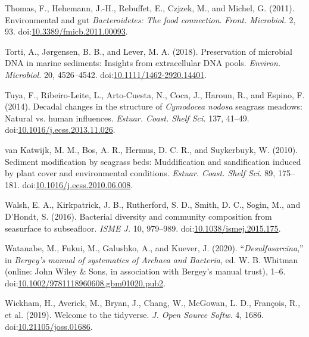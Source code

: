 \documentclass[12pt,]{article}
\begin{document}
\leavevmode\hypertarget{ref-Thomas2011}{}%
Thomas, F., Hehemann, J.-H., Rebuffet, E., Czjzek, M., and Michel, G.
(2011). Environmental and gut \emph{Bacteroidetes\textup{: The food
connection}}. \emph{Front. Microbiol.} 2, 93.
doi:\href{https://doi.org/10.3389/fmicb.2011.00093}{10.3389/fmicb.2011.00093}.

\leavevmode\hypertarget{ref-Torti2018}{}%
Torti, A., Jørgensen, B. B., and Lever, M. A. (2018). Preservation of
microbial DNA in marine sediments: Insights from extracellular DNA
pools. \emph{Environ. Microbiol.} 20, 4526--4542.
doi:\href{https://doi.org/10.1111/1462-2920.14401}{10.1111/1462-2920.14401}.

\leavevmode\hypertarget{ref-Tuya2014}{}%
Tuya, F., Ribeiro-Leite, L., Arto-Cuesta, N., Coca, J., Haroun, R., and
Espino, F. (2014). Decadal changes in the structure of \emph{Cymodocea
nodosa} seagrass meadows: Natural vs. human influences. \emph{Estuar.
Coast. Shelf Sci.} 137, 41--49.
doi:\href{https://doi.org/10.1016/j.ecss.2013.11.026}{10.1016/j.ecss.2013.11.026}.

\leavevmode\hypertarget{ref-vanKatwijk2010}{}%
van Katwijk, M. M., Bos, A. R., Hermus, D. C. R., and Suykerbuyk, W.
(2010). Sediment modification by seagrass beds: Muddification and
sandification induced by plant cover and environmental conditions.
\emph{Estuar. Coast. Shelf Sci.} 89, 175--181.
doi:\href{https://doi.org/10.1016/j.ecss.2010.06.008}{10.1016/j.ecss.2010.06.008}.

\leavevmode\hypertarget{ref-Walsh2016c}{}%
Walsh, E. A., Kirkpatrick, J. B., Rutherford, S. D., Smith, D. C.,
Sogin, M., and D'Hondt, S. (2016). Bacterial diversity and community
composition from seasurface to subseafloor. \emph{ISME J.} 10, 979--989.
doi:\href{https://doi.org/10.1038/ismej.2015.175}{10.1038/ismej.2015.175}.

\leavevmode\hypertarget{ref-Watanabe2020}{}%
Watanabe, M., Fukui, M., Galushko, A., and Kuever, J. (2020).
``\emph{Desulfosarcina\textup{}},'' in \emph{Bergey's manual of
systematics of Archaea and Bacteria}, ed. W. B. Whitman (online: John
Wiley \& Sons, in association with Bergey's manual trust), 1--6.
doi:\href{https://doi.org/10.1002/9781118960608.gbm01020.pub2}{10.1002/9781118960608.gbm01020.pub2}.

\leavevmode\hypertarget{ref-Wickham2019a}{}%
Wickham, H., Averick, M., Bryan, J., Chang, W., McGowan, L. D.,
François, R., et al. (2019). Welcome to the tidyverse. \emph{J. Open
Source Softw.} 4, 1686.
doi:\href{https://doi.org/10.21105/joss.01686}{10.21105/joss.01686}.
\end{document}
